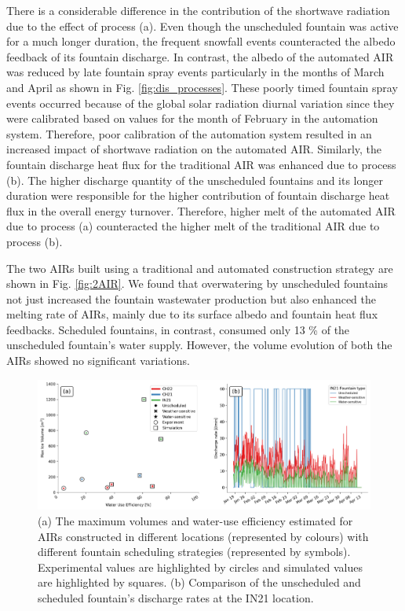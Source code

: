 There is a considerable difference in the contribution of the shortwave radiation due to the effect of process
(a). Even though the unscheduled fountain was active for a much longer duration, the frequent snowfall events
counteracted the albedo feedback of its fountain discharge. In contrast, the albedo of the automated AIR was
reduced by late fountain spray events particularly in the months of March and April as shown in Fig.
\ref{fig:dis_processes}. These poorly timed fountain spray events occurred because of the global solar radiation
diurnal variation since they were calibrated based on values for the month of February in the automation system.
Therefore, poor calibration of the automation system resulted in an increased impact of shortwave radiation on
the automated AIR. Similarly, the fountain discharge heat flux for the traditional AIR was enhanced due to
process (b). The higher discharge quantity of the unscheduled fountains and its longer duration were responsible
for the higher contribution of fountain discharge heat flux in the overall energy turnover. Therefore, higher
melt of the automated AIR due to process (a) counteracted the higher melt of the traditional AIR due to process
(b).

The two AIRs built using a traditional and automated construction strategy are shown in Fig. \ref{fig:2AIR}. We
found that overwatering by unscheduled fountains not just increased the fountain wastewater production but also
enhanced the melting rate of AIRs, mainly due to its surface albedo and fountain heat flux feedbacks. Scheduled
fountains, in contrast, consumed only 13 \% of the unscheduled fountain's water supply. However, the volume
evolution of both the AIRs showed no significant variations. 

\begin{figure}[htb]
\includegraphics[width=\textwidth]{figs/wue.png}

\caption{(a) The maximum volumes and water-use efficiency estimated for AIRs constructed in different locations
(represented by colours) with different fountain scheduling strategies (represented by symbols). Experimental
values are highlighted by circles and simulated values are highlighted by squares. (b) Comparison of
the unscheduled and scheduled fountain's discharge rates at the IN21 location.}

\label{fig:wue}
\end{figure}

